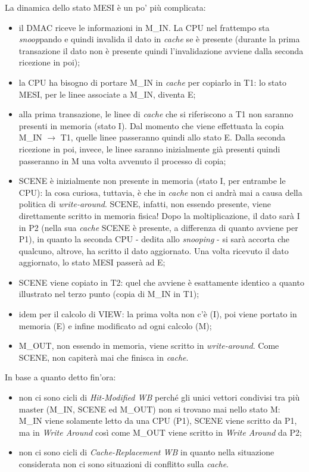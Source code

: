 La dinamica dello stato MESI è un po' più complicata:
\begin{itemize}
\item il DMAC riceve le informazioni in M\_IN. La CPU nel frattempo sta \textit{snoop}pando e quindi invalida il dato in \textit{cache} se è presente (durante la prima transazione il dato non è presente quindi l'invalidazione avviene dalla seconda ricezione in poi);
\item la CPU ha bisogno di portare M\_IN in \textit{cache} per copiarlo in T1: lo stato MESI, per le linee associate a M\_IN, diventa E;
\item alla prima transazione, le linee di \textit{cache} che si riferiscono a T1 non saranno presenti in memoria (stato I). Dal momento che viene effettuata la copia M\_IN $\to$ T1, quelle linee passeranno quindi allo stato E. Dalla seconda ricezione in poi, invece, le linee saranno inizialmente già presenti quindi passeranno in M una volta avvenuto il processo di copia;
\item SCENE è inizialmente non presente in memoria (stato I, per entrambe le CPU): la cosa curiosa, tuttavia, è che in \textit{cache} non ci andrà mai a causa della politica di \textit{write-around}. SCENE, infatti, non essendo presente, viene direttamente scritto in memoria fisica! Dopo la moltiplicazione, il dato sarà I in P2 (nella sua \textit{cache} SCENE è presente, a differenza di quanto avviene per P1), in quanto la seconda CPU - dedita allo \textit{snooping} - si sarà accorta che qualcuno, altrove, ha scritto il dato aggiornato. Una volta ricevuto il dato aggiornato, lo stato MESI passerà ad E;
\item SCENE viene copiato in T2: quel che avviene è esattamente identico a quanto illustrato nel terzo punto (copia di M\_IN in T1);
\item idem per il calcolo di VIEW: la prima volta non c'è (I), poi viene portato in memoria (E) e infine modificato ad ogni calcolo (M);
\item M\_OUT, non essendo in memoria, viene scritto in \textit{write-around}. Come SCENE, non capiterà mai che finisca in \textit{cache}.
\end{itemize}

In base a quanto detto fin'ora:
\begin{itemize}
\item non ci sono cicli di \textit{Hit-Modified WB} perché gli unici vettori condivisi tra più master (M\_IN, SCENE ed M\_OUT) non si trovano mai nello stato M: M\_IN viene solamente letto da una CPU (P1), SCENE viene scritto da P1, ma in \textit{Write Around} così come M\_OUT viene scritto in \textit{Write Around} da P2;
\item non ci sono cicli di \textit{Cache-Replacement WB} in quanto nella situazione considerata non ci sono situazioni di conflitto sulla \textit{cache}.
\end{itemize}

